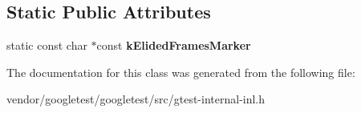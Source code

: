 \subsection*{Static Public Attributes}
\begin{DoxyCompactItemize}
\item 
static const char $\ast$const {\bfseries k\+Elided\+Frames\+Marker}\hypertarget{classtesting_1_1internal_1_1OsStackTraceGetterInterface_a685bc0c5df3fe58bc49444319a67ead2}{}\label{classtesting_1_1internal_1_1OsStackTraceGetterInterface_a685bc0c5df3fe58bc49444319a67ead2}

\end{DoxyCompactItemize}


The documentation for this class was generated from the following file\+:\begin{DoxyCompactItemize}
\item 
vendor/googletest/googletest/src/gtest-\/internal-\/inl.\+h\end{DoxyCompactItemize}
